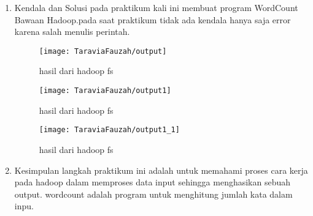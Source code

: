 \begin{enumerate}
\item Kendala dan Solusi
\newline pada praktikum kali ini membuat program WordCount Bawaan Hadoop.pada saat praktikum tidak ada kendala hanya saja error karena salah menulis perintah.

\begin{figure}[!ht]
\texttt{[image: TaraviaFauzah/output]}
\caption{hasil dari hadoop fs}
\label{gam:perkuliahan1-10}
\end{figure}

\begin{figure}[!ht]
\texttt{[image: TaraviaFauzah/output1]}
\caption{hasil dari hadoop fs}
\label{gam:perkuliahan1-10}
\end{figure}

\begin{figure}[!ht]
\texttt{[image: TaraviaFauzah/output1\_1]}
\caption{hasil dari hadoop fs}
\label{gam:perkuliahan1-10}
\end{figure}

\item Kesimpulan
\newline langkah praktikum ini adalah untuk memahami proses cara kerja pada hadoop dalam memproses data input sehingga menghasikan sebuah output. wordcount adalah program untuk menghitung jumlah kata dalam inpu.

\end{enumerate}


